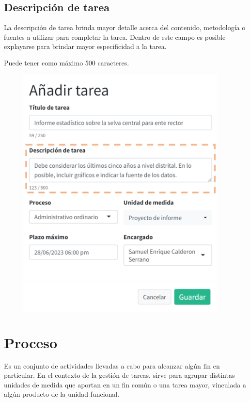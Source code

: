\documentclass[
  letterpaper,
  DIV=11,
  numbers=noendperiod]{scrreprt}
\begin{document}
\hypertarget{descripciuxf3n-de-tarea}{%
\subsection{Descripción de tarea}\label{descripciuxf3n-de-tarea}}

La descripción de tarea brinda mayor detalle acerca del contenido,
metodología o fuentes a utilizar para completar la tarea. Dentro de este
campo es posible explayarse para brindar mayor especificidad a la tarea.

Puede tener como máximo 500 caracteres.

\begin{figure}

{\centering \includegraphics[width=4.16667in,height=\textheight]{./img/manual-user/new-task-description.png}

}

\end{figure}

\hypertarget{proceso}{%
\section{Proceso}\label{proceso}}

Es un conjunto de actividades llevadas a cabo para alcanzar algún fin en
particular. En el contexto de la gestión de tareas, sirve para agrupar
distintas unidades de medida que aportan en un fin común o una tarea
mayor, vinculada a algún producto de la unidad funcional.
\end{document}
